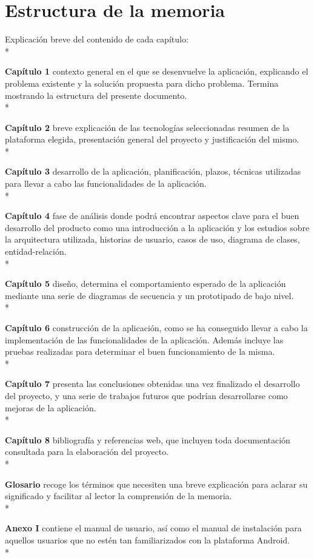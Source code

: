 \documentclass[../pfc.tex]{subfiles}
\begin{document}
\section{Estructura de la memoria}

Explicación breve del contenido de cada capítulo:\\*

  \textbf{Capítulo 1} contexto general en el que se desenvuelve la aplicación, explicando el problema existente y la solución propuesta para dicho problema. Termina mostrando la estructura del presente documento.\\*
  
  \textbf{Capítulo 2} breve explicación de las tecnologías seleccionadas resumen de la plataforma elegida, presentación general del proyecto y justificación del mismo.\\*
  
  \textbf{Capítulo 3} desarrollo de la aplicación, planificación, plazos, técnicas utilizadas para llevar a cabo las funcionalidades de la aplicación.\\*
  
  \textbf{Capítulo 4} fase de análisis donde podrá encontrar aspectos clave para el buen desarrollo del producto como una introducción a la aplicación y los estudios sobre la arquitectura utilizada, historias de usuario, casos de uso, diagrama de clases, entidad-relación.\\*
  
  \textbf{Capítulo 5} diseño, determina el comportamiento esperado de la aplicación mediante una serie de diagramas de secuencia y un prototipado de bajo nivel.\\*
  
  \textbf{Capítulo 6} construcción de la aplicación, como se ha conseguido llevar a cabo la implementación de las funcionalidades de la aplicación. Además incluye las pruebas realizadas para determinar el buen funcionamiento de la misma.\\*
  
  \textbf{Capítulo 7} presenta las conclusiones obtenidas una vez finalizado el desarrollo del proyecto, y una serie de trabajos futuros que podrían desarrollarse como mejoras de la aplicación.\\*
  
  \textbf{Capítulo 8} bibliografía y referencias web, que incluyen toda documentación consultada para la elaboración del proyecto.\\* 
  
  \textbf{Glosario} recoge los términos que necesiten una breve explicación para aclarar su significado y facilitar al lector la comprensión de la memoria.\\* 
  
  \textbf{Anexo I} contiene el manual de usuario, así como el manual de instalación para aquellos usuarios que no estén tan familiarizados con la plataforma Android.\\*

 
\end{document}

